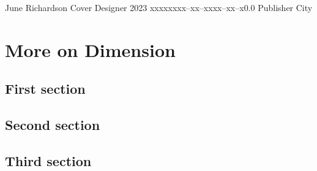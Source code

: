 \documentclass{tstextbook}
\begin{document}
       {June Richardson}
       {Cover Designer}
       {2023}
       {xxxxx}{xxx--xx--xxxx--xx--x}{0.0}
       {Publisher}
       {City}


\setcounter{chapter}{-1}








\chapter{More on Dimension}

\begin{summary}
  \blindtext
\end{summary}

\section{First section}
\Blindtext

\section{Second section}
\Blindtext

\section{Third section}
\Blindtext


\printbibliography{}


\printindex
\end{document}
